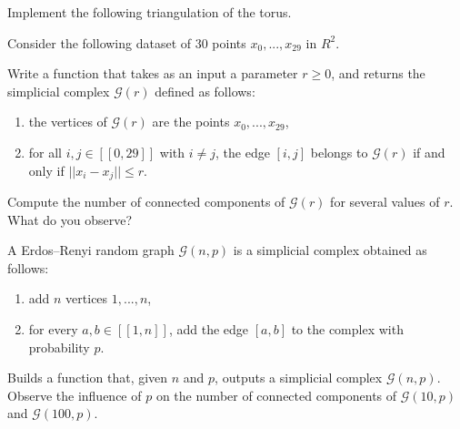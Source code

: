 \begin{exercise}
    Implement the following triangulation of the torus.
\end{exercise}

\begin{exercise}
    Consider the following dataset of 30 points $x_0, ..., x_{29}$ in $R^2$.

    Write a function that takes as an input a parameter $r \ge 0$, and returns
    the simplicial complex $\mathcal{G}(r)$ defined as follows:
    \begin{enumerate}
        \item the vertices of $\mathcal{G}(r)$ are the points $x_0, ..., x_{29}$,
        \item for all $i, j \in [[0, 29]]$ with $i \neq j$, the edge $[i, j]$ belongs to $\mathcal{G}(r)$ if and only if
        $||x_i - x_j|| \le r$.
    \end{enumerate}
    
    Compute the number of connected components of $\mathcal{G}(r)$ for several
    values of $r$. What do you observe?
\end{exercise}

\begin{exercise}
    A Erdos–Renyi random graph $\mathcal{G}(n, p)$ is a simplicial complex
    obtained as follows:
    \begin{enumerate}
        \item add $n$ vertices $1, ..., n$,
        \item for every $a, b \in [[1, n]]$, add the edge $[a, b]$ to the complex with probability $p$.
    \end{enumerate}

    Builds a function that, given $n$ and $p$, outputs a simplicial complex $\mathcal{G}(n, p)$. Observe
    the influence of $p$ on the number of connected components of $\mathcal{G}(10, p)$ and $\mathcal{G}(100, p)$.
\end{exercise}